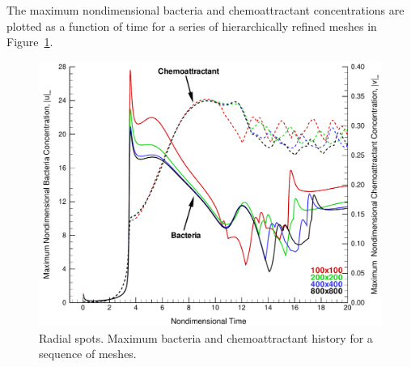 

The maximum nondimensional bacteria and chemoattractant concentrations are plotted as a function of time for a series of hierarchically refined meshes in Figure~\ref{fig:bio_radial_spots_max_history}.
\begin{figure}[hbp]
  \begin{center}
    \includegraphics[width=\textwidth]{figures/bio_radial_spots/max_history}
    \caption{Radial spots.  Maximum bacteria and chemoattractant history for a sequence of meshes.\label{fig:bio_radial_spots_max_history}}
  \end{center}
\end{figure}

